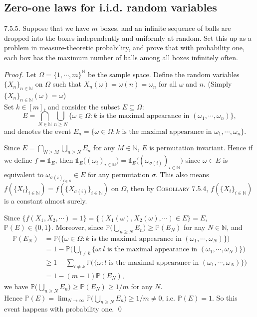 \subsection{Zero-one laws for i.i.d. random variables}

\begin{exercise}7.5.5.
Suppose that we have $m$ boxes, and an infinite sequence of
balls are dropped into the boxes independently and uniformly at random. Set this
up as a problem in measure-theoretic probability, and prove that with probability
one, each box has the maximum number of balls among all boxes infinitely often.
\end{exercise}
$Proof.$ Let $\Omega=\{1,\cdots,m\}^\mathbb{N}$ be the sample space. Define the random variables $\{X_n\}_{n\in\mathbb{N}}$ on $\Omega$ such that $X_n(\omega)=\omega(n)=\omega_n$ for all $\omega$ and $n$. (Simply $\{X_n\}_{n\in\mathbb{N}}(\omega)=\omega$)\\
Set $k\in[m]$, and consider the subset $E\subseteq\Omega$:
\begin{equation*}
    E=\bigcap_{N\in\mathbb{N}}\bigcup_{n\geq N}\{\omega\in\Omega:k\text{ is the maximal appearance in }(\omega_1,\cdots,\omega_n)\},
\end{equation*}
and denotes the event $E_n=\{\omega\in\Omega:k\text{ is the maximal appearance in }\omega_1,\cdots,\omega_n\}$.

Since $E = \bigcap_{N\geq M}\bigcup_{n\geq N}E_n$ for any $M\in\mathbb{N}$, $E$ is permutation invariant. Hence if we define $f=\mathds{1}_E$, then $\mathds{1}_E\big((\omega_i)_{i\in\mathbb{N}}\big)=\mathds{1}_E\big((\omega_{\sigma(i)})_{i\in\mathbb{N}}\big)$ since $\omega\in E$ is equivalent to $\omega_{\sigma(i)}_{i\in\mathbb{N}}\in E$ for any permutation $\sigma$. This also means $f(\{X_i\}_{i\in\mathbb{N}})=f(\{X_{\sigma(i)}\}_{i\in\mathbb{N}})$ on $\Omega$, then by \textsc{Corollary 7.5.4}, $f(\{X_i\}_{i\in\mathbb{N}})$ is a constant almost surely.

Since $\{f(X_1,X_2,\cdots)=1\}=\{(X_1(\omega),X_2(\omega),\cdots)\in E\}=E$, $\mathbb{P}(E)\in\{0,1\}$. Moreover, since $\mathbb{P}\Big(\bigcup_{n\geq N} E_n\Big)\geq\mathbb{P}(E_N)$ for any  $N\in\mathbb{N}$, and
\begin{equation*}
    \begin{aligned}
        \mathbb{P}(E_N)&=\mathbb{P}\big(\{\omega\in\Omega:k\text{ is the maximal appearance in }(\omega_1,\cdots,\omega_N)\}\big)\\
        &= 1-\mathbb{P}\Big(\bigcup_{l\neq k}\{\omega:l\text{ is the maximal appearance in }(\omega_1,\cdots,\omega_N)\}\Big)\\
        &\geq 1-\sum_{l\neq k}\mathbb{P}\big(\{\omega:l\text{ is the maximal appearance in }(\omega_1,\cdots,\omega_N)\}\big)\\
        &=1-(m-1)\mathbb{P}(E_N),
    \end{aligned}
\end{equation*}
we have $\mathbb{P}\Big(\bigcup_{n\geq N} E_n\Big)\geq\mathbb{P}(E_N)\geq 1/m$ for any $N$.\\
Hence $\mathbb{P}(E)=\lim_{N\rightarrow\infty}\mathbb{P}\Big(\bigcup_{n\geq N}E_n\Big)\geq 1/m\neq 0$, i.e. $\mathbb{P}(E)=1$. So this event happens with probability one. \qed \qquad

